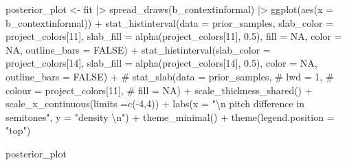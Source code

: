 \documentclass[
  doc,
  longtable,
  nolmodern,
  notxfonts,
  notimes,
  colorlinks=true,linkcolor=blue,citecolor=blue,urlcolor=blue]{apa7}
\newenvironment{Shaded}{\begin{snugshade}}{\end{snugshade}}
\newcommand{\AttributeTok}[1]{\textcolor[rgb]{0.40,0.45,0.13}{#1}}
\newcommand{\CommentTok}[1]{\textcolor[rgb]{0.37,0.37,0.37}{#1}}
\newcommand{\ConstantTok}[1]{\textcolor[rgb]{0.56,0.35,0.01}{#1}}
\newcommand{\DecValTok}[1]{\textcolor[rgb]{0.68,0.00,0.00}{#1}}
\newcommand{\FloatTok}[1]{\textcolor[rgb]{0.68,0.00,0.00}{#1}}
\newcommand{\FunctionTok}[1]{\textcolor[rgb]{0.28,0.35,0.67}{#1}}
\newcommand{\NormalTok}[1]{\textcolor[rgb]{0.00,0.23,0.31}{#1}}
\newcommand{\OtherTok}[1]{\textcolor[rgb]{0.00,0.23,0.31}{#1}}
\newcommand{\SpecialCharTok}[1]{\textcolor[rgb]{0.37,0.37,0.37}{#1}}
\newcommand{\StringTok}[1]{\textcolor[rgb]{0.13,0.47,0.30}{#1}}
\begin{document}
\begin{Shaded}
\begin{Highlighting}[]
\NormalTok{posterior\_plot }\OtherTok{\textless{}{-}} 
\NormalTok{  fit }\SpecialCharTok{|\textgreater{}} 
  \FunctionTok{spread\_draws}\NormalTok{(b\_contextinformal) }\SpecialCharTok{|\textgreater{}} 
  \FunctionTok{ggplot}\NormalTok{(}\FunctionTok{aes}\NormalTok{(}\AttributeTok{x =}\NormalTok{ b\_contextinformal)) }\SpecialCharTok{+} 
    \FunctionTok{stat\_histinterval}\NormalTok{(}\AttributeTok{data =}\NormalTok{ prior\_samples,}
                     \AttributeTok{slab\_color =}\NormalTok{ project\_colors[}\DecValTok{11}\NormalTok{],}
                     \AttributeTok{slab\_fill =} \FunctionTok{alpha}\NormalTok{(project\_colors[}\DecValTok{11}\NormalTok{], }\FloatTok{0.5}\NormalTok{),}
                     \AttributeTok{fill =} \ConstantTok{NA}\NormalTok{,}
                     \AttributeTok{color =} \ConstantTok{NA}\NormalTok{,}
                     \AttributeTok{outline\_bars =} \ConstantTok{FALSE}\NormalTok{) }\SpecialCharTok{+}
    \FunctionTok{stat\_histinterval}\NormalTok{(}\AttributeTok{slab\_color =}\NormalTok{ project\_colors[}\DecValTok{14}\NormalTok{],}
                      \AttributeTok{slab\_fill =} \FunctionTok{alpha}\NormalTok{(project\_colors[}\DecValTok{14}\NormalTok{], }\FloatTok{0.5}\NormalTok{),}
                      \AttributeTok{color =} \ConstantTok{NA}\NormalTok{,}
                      \AttributeTok{outline\_bars =} \ConstantTok{FALSE}\NormalTok{) }\SpecialCharTok{+}
  \CommentTok{\# stat\_slab(data = prior\_samples,}
  \CommentTok{\#           lwd = 1,}
  \CommentTok{\#           colour = project\_colors[11],}
  \CommentTok{\#           fill = NA) +}
  \FunctionTok{scale\_thickness\_shared}\NormalTok{() }\SpecialCharTok{+}
  \FunctionTok{scale\_x\_continuous}\NormalTok{(}\AttributeTok{limits =}\FunctionTok{c}\NormalTok{(}\SpecialCharTok{{-}}\DecValTok{4}\NormalTok{,}\DecValTok{4}\NormalTok{)) }\SpecialCharTok{+}
  \FunctionTok{labs}\NormalTok{(}\AttributeTok{x =} \StringTok{"}\SpecialCharTok{\textbackslash{}n}\StringTok{ pitch difference in semitones"}\NormalTok{,}
       \AttributeTok{y =} \StringTok{"density }\SpecialCharTok{\textbackslash{}n}\StringTok{"}\NormalTok{) }\SpecialCharTok{+}
  \FunctionTok{theme\_minimal}\NormalTok{() }\SpecialCharTok{+}
  \FunctionTok{theme}\NormalTok{(}\AttributeTok{legend.position =} \StringTok{"top"}\NormalTok{)}

\NormalTok{posterior\_plot}
\end{Highlighting}
\end{Shaded}
\end{document}
